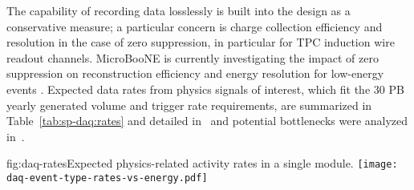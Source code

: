 The capability of recording data losslessly is built into the design
as a conservative measure; a particular concern is charge collection
efficiency and resolution in the case of zero suppression, in particular for TPC
induction wire readout channels.
MicroBooNE is currently investigating the impact of zero suppression
on reconstruction efficiency and energy resolution for low-energy
events \cite{MICROBOONE-NOTE-1030-PUB}.
Expected data rates from physics signals of interest, which fit the 30 PB yearly generated volume and trigger rate requirements, are summarized in Table~\ref{tab:sp-daq:rates} and detailed in~ and potential bottlenecks were analyzed in~.

\begin{dunefigure}{fig:daq-rates}{Expected physics-related activity
    rates in a single \nominalmodsize module. \label{sec:fd-daq:rates}
}
  \texttt{[image: daq-event-type-rates-vs-energy.pdf]}
\end{dunefigure}

